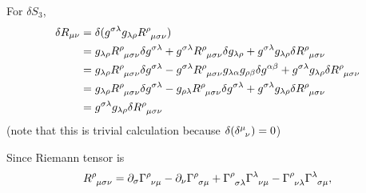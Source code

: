 \documentclass{article}
\theoremstyle{definition}
\def\t{\tensor}
\begin{document}
For $\delta S_3$, 
\begin{align}
    \delta R_{\mu\nu} &= \delta ( g^{\sigma \lambda} g_{\lambda\rho} \t{R}{^\rho_\mu_\sigma_\nu} ) \\
                      &= g_{\lambda\rho} \t{R}{^\rho_\mu_\sigma_\nu} \delta g^{\sigma\lambda} + g^{\sigma \lambda} \t{R}{^\rho_\mu_\sigma_\nu} \delta g_{\lambda\rho} + g^{\sigma\lambda} g_{\lambda\rho} \delta \t{R}{^\rho_\mu_\sigma_\nu} \\
                      &= g_{\lambda\rho} \t{R}{^\rho_\mu_\sigma_\nu} \delta g^{\sigma\lambda} - g^{\sigma \lambda} \t{R}{^\rho_\mu_\sigma_\nu}  g_{\lambda \alpha} g_{\rho \beta} \delta g^{\alpha\beta} + g^{\sigma\lambda} g_{\lambda\rho} \delta \t{R}{^\rho_\mu_\sigma_\nu} \\
                      &= g_{\lambda\rho} \t{R}{^\rho_\mu_\sigma_\nu} \delta g^{\sigma\lambda} -  g_{\rho \lambda}\t{R}{^\rho_\mu_\sigma_\nu}    \delta g^{\sigma\lambda} + g^{\sigma\lambda} g_{\lambda\rho} \delta \t{R}{^\rho_\mu_\sigma_\nu} \\
                      &=  g^{\sigma\lambda} g_{\lambda\rho} \delta \t{R}{^\rho_\mu_\sigma_\nu} \\
\end{align}
(note that this is trivial calculation because $\delta (\t{\delta}{^\mu_\nu}) = 0$)

Since Riemann tensor is
\begin{equation}
    \t{R}{^\rho_\mu_\sigma_\nu} = \partial_\sigma \t{\Gamma}{^\rho_\nu_\mu} - \partial_\nu \t{\Gamma}{^\rho_\sigma_\mu} + \t{\Gamma}{^\rho_\sigma_\lambda} \t{\Gamma}{^\lambda_\nu_\mu} - \t{\Gamma}{^\rho_\nu_\lambda} \t{\Gamma}{^\lambda_\sigma_\mu},
\end{equation}
\end{document}

